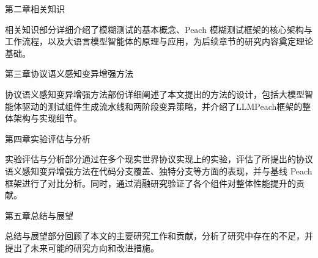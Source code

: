 第二章\quad 相关知识

相关知识部分详细介绍了模糊测试的基本概念、Peach 模糊测试框架的核心架构与工作流程，以及大语言模型智能体的原理与应用，为后续章节的研究内容奠定理论基础。

第三章\quad 协议语义感知变异增强方法

协议语义感知变异增强方法部份详细阐述了本文提出的方法的设计，包括大模型智能体驱动的测试组件生成流水线和两阶段变异策略，并介绍了LLMPeach框架的整体架构与实现细节。

第四章\quad 实验评估与分析

实验评估与分析部分通过在多个现实世界协议实现上的实验，评估了所提出的协议语义感知变异增强方法在代码分支覆盖、独特分支等方面的表现，并与基线 Peach 框架进行了对比分析。同时，通过消融研究验证了各个组件对整体性能提升的贡献。

第五章\quad 总结与展望

总结与展望部分回顾了本文的主要研究工作和贡献，分析了研究中存在的不足，并提出了未来可能的研究方向和改进措施。